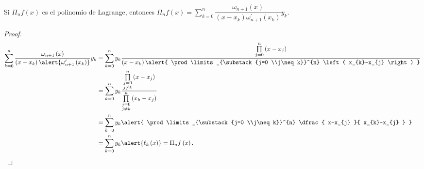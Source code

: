 \begin{frame}
	\begin{theorem}
		Si $\Pi_{n}f\left(x\right)$ es el polinomio de Lagrange, entonces
		\begin{math}
			\Pi_{n}f\left(x\right)=
			\sum\limits_{k=0}^{n}
			\dfrac{
				\omega_{n+1}\left(x\right)
			}{
				\left(x-x_{k}\right)
				\omega^{\prime}_{n+1}\left(x_{k}\right)
			}
			y_{k}
		\end{math}.
	\end{theorem}

	\begin{proof}
		\begin{align*}
			\sum\limits_{k=0}^{n}
			\dfrac{
				\omega_{n+1}\left(x\right)
			}{
				\left(x-x_{k}\right)
				\alert{
					\omega^{\prime}_{n+1}\left(x_{k}\right)
				}
			}
			y_{k} & =
			\sum\limits_{k=0}^{n}
			y_{k}
			\dfrac{
				\prod\limits_{j=0}^{n}
				\left(
				x-x_{j}
				\right)
			}{
				\left(x-x_{k}\right)
				\alert{
			\prod\limits_{\substack{j=0 \\j\neq k}}^{n}
					\left(
					x_{k}-x_{j}
					\right)
				}
			}
			\\
			      & =
			\sum\limits_{k=0}^{n}
			y_{k}
			\dfrac{
			\prod\limits_{\substack{j=0 \\j\neq k}}^{n}
				\left(
				x-x_{j}
				\right)
			}{
			\prod\limits_{\substack{j=0 \\j\neq k}}^{n}
				\left(
				x_{k}-x_{j}
				\right)
			}
			\\
			      & =
			\sum\limits_{k=0}^{n}
			y_{k}
			\alert{
			\prod\limits_{\substack{j=0 \\j\neq k}}^{n}
			\dfrac{
			x-x_{j}
			}{
			x_{k}-x_{j}
			}
			}                           \\
			      & =
			\sum\limits_{k=0}^{n}
			y_{k}
			\alert{
				\ell_{k}\left(x\right)
			}
			=
			\Pi_{n}
			f\left(x\right).
		\end{align*}
	\end{proof}
\end{frame}

